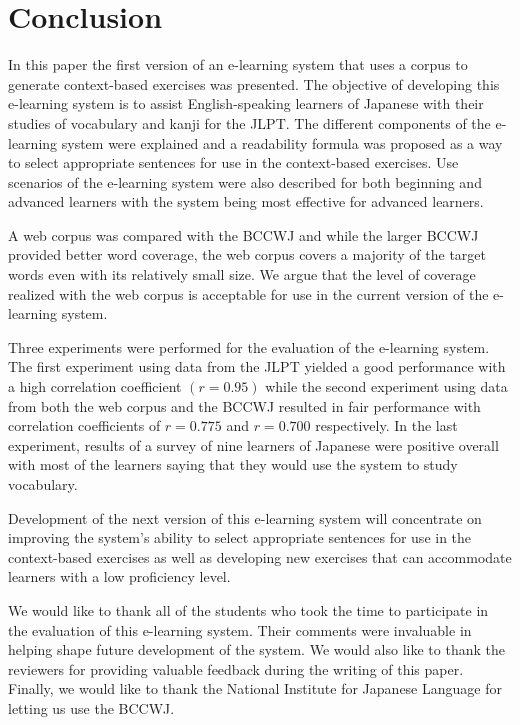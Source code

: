 \documentclass[english]{jnlp_1.4}
\begin{document}
\section{Conclusion}

In this paper the first version of an e-learning system that uses a corpus to generate context-based exercises was presented. The objective of developing this e-learning system is to assist English-speaking learners of Japanese with their studies of vocabulary and kanji for the JLPT. The different components of the e-learning system were explained and a readability formula was proposed as a way to select appropriate sentences for use in the context-based exercises. Use scenarios of the e-learning system were also described for both beginning and advanced learners with the system being most effective for advanced learners.

A web corpus was compared with the BCCWJ and while the larger BCCWJ provided better word coverage, the web corpus covers a majority of the target words even with its relatively small size. We argue that the level of coverage realized with the web corpus is acceptable for use in the current version of the e-learning system.

Three experiments were performed for the evaluation of the e-learning system. The first experiment using data from the JLPT yielded a good performance with a high correlation coefficient $(r = 0.95)$ while the second experiment using data from both the web corpus and the BCCWJ resulted in fair performance with correlation coefficients of $r = 0.775$ and $r = 0.700$ respectively. In the last experiment, results of a survey of nine learners of Japanese were positive overall with most of the learners saying that they would use the system to study vocabulary.

Development of the next version of this e-learning system will concentrate on improving the system's ability to select appropriate sentences for use in the context-based exercises as well as developing new exercises that can accommodate learners with a low proficiency level.


\acknowledgment

We would like to thank all of the students who took the time to participate in the evaluation of this e-learning system. Their comments were invaluable in helping shape future development of the system. We would also like to thank the reviewers for providing valuable feedback during the writing of this paper. Finally, we would like to thank the National Institute for Japanese Language for letting us use the BCCWJ.
\end{document}
